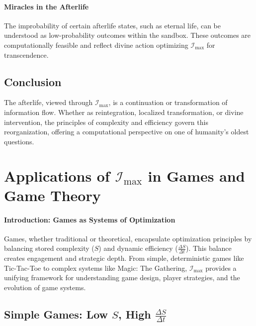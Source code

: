 \documentclass[12pt]{article}
\begin{document}
\paragraph{Miracles in the Afterlife}
The improbability of certain afterlife states, such as eternal life, can be understood as low-probability outcomes within the sandbox. These outcomes are computationally feasible and reflect divine action optimizing \(\mathcal{I}_{\text{max}}\) for transcendence.

\subsection{Conclusion}
The afterlife, viewed through \(\mathcal{I}_{\text{max}}\), is a continuation or transformation of information flow. Whether as reintegration, localized transformation, or divine intervention, the principles of complexity and efficiency govern this reorganization, offering a computational perspective on one of humanity's oldest questions.


\section{Applications of \(\mathcal{I}_{\text{max}}\) in Games and Game Theory}

\paragraph{Introduction: Games as Systems of Optimization}
Games, whether traditional or theoretical, encapsulate optimization principles by balancing stored complexity (\(S\)) and dynamic efficiency (\(\frac{\Delta S}{\Delta t}\)). This balance creates engagement and strategic depth. From simple, deterministic games like Tic-Tac-Toe to complex systems like Magic: The Gathering, \(\mathcal{I}_{\text{max}}\) provides a unifying framework for understanding game design, player strategies, and the evolution of game systems.

\subsection{Simple Games: Low \(S\), High \(\frac{\Delta S}{\Delta t}\)}
\end{document}
